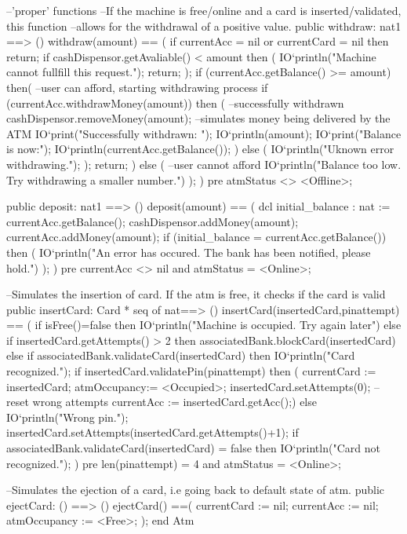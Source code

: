 \documentclass[a4paper]{article}
\begin{document}
\begin{vdm_al}
    --'proper' functions
    --If the machine is free/online and a card is inserted/validated, this function
    --allows for the withdrawal of a positive value. 
    public withdraw: nat1 ==> ()
    withdraw(amount) == (
        if currentAcc = nil or currentCard = nil then return;
        if cashDispensor.getAvaliable() < amount then (
            IO`println("Machine cannot fullfill this request.");
            return;
        );
        if (currentAcc.getBalance() >= amount) then( --user can afford, starting withdrawing process
            if (currentAcc.withdrawMoney(amount)) then ( --successfully withdrawn
                cashDispensor.removeMoney(amount); --simulates money being delivered by the ATM
                IO`print("Successfully withdrawn: ");
                IO`println(amount);
                IO`print("Balance is now:");
                IO`println(currentAcc.getBalance());
                )
                else (
                    IO`println("Uknown error withdrawing.");
                );
        return;
        ) 
        else ( --user cannot afford
            IO`println("Balance too low. Try withdrawing a smaller number.")
        );  
    )
    pre atmStatus <> <Offline>;

    public deposit: nat1 ==> ()
    deposit(amount) == (
        dcl initial_balance : nat := currentAcc.getBalance();
        cashDispensor.addMoney(amount);
        currentAcc.addMoney(amount);
        if (initial_balance = currentAcc.getBalance()) then (
            IO`println("An error has occured. The bank has been notified, please hold.")
        ); 
    )
    pre currentAcc <> nil and atmStatus = <Online>;



    --Simulates the insertion of card. If the atm is free, it checks if the card is valid
    public insertCard: Card * seq of nat==> ()
    insertCard(insertedCard,pinattempt) == (
        if isFree()=false
        then IO`println("Machine is occupied. Try again later")
        else if insertedCard.getAttempts() > 2 then associatedBank.blockCard(insertedCard)
        else if associatedBank.validateCard(insertedCard)
        then IO`println("Card recognized.");
            if insertedCard.validatePin(pinattempt) then (
                currentCard := insertedCard;
                atmOccupancy:= <Occupied>;
                insertedCard.setAttempts(0); --reset wrong attempts 
                currentAcc := insertedCard.getAcc();)
            else 
            IO`println("Wrong pin.");
            insertedCard.setAttempts(insertedCard.getAttempts()+1);
        if associatedBank.validateCard(insertedCard) = false then IO`println("Card not recognized.");
    )
    pre len(pinattempt) = 4 and atmStatus = <Online>;
    
    --Simulates the ejection of a card, i.e going back to default state of atm.
    public ejectCard: () ==> () 
    ejectCard() ==(
        currentCard := nil;
        currentAcc := nil;
        atmOccupancy := <Free>;
    );    
end Atm
\end{vdm_al}
\end{document}
